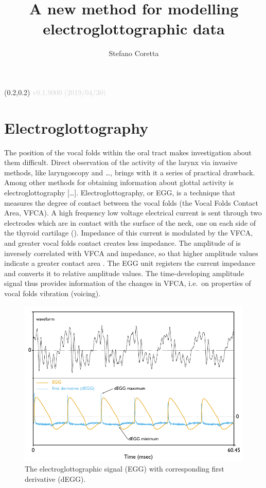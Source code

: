\documentclass[
  12pt,
  a4paper,
]{article}
\title{A new method for modelling electroglottographic data}
\author{Stefano Coretta}
\date{}
\begin{document}
\begin{textblock}{3}(0.2,0.2)
  \textcolor{lightgray}{v0.1.9000 (2019/04/30)}
\end{textblock}
\maketitle

\hypertarget{electroglottography}{%
\section{Electroglottography}\label{electroglottography}}

The position of the vocal folds within the oral tract makes
investigation about them difficult. Direct observation of the activity
of the larynx via invasive methods, like laryngoscopy and \ldots{},
brings with it a series of practical drawback. Among other methods for
obtaining information about glottal activity is electroglottography
{[}\ldots{}{]}. Electroglottography, or EGG, \citep{fabre1957} is a
technique that measures the degree of contact between the vocal folds
(the Vocal Folds Contact Area, VFCA). A high frequency low voltage
electrical current is sent through two electrodes which are in contact
with the surface of the neck, one on each side of the thyroid cartilage
(). Impedance of this current is modulated by the
VFCA, and greater vocal folds contact creates less impedance. The
amplitude of is inversely correlated with VFCA and impedance, so that
higher amplitude values indicate a greater contact area
\citep{titze1990}. The EGG unit registers the current impedance and
converts it to relative amplitude values. The time-developing amplitude
signal thus provides information of the changes in VFCA, i.e.~on
properties of vocal folds vibration (voicing).

\begin{figure}
  \includegraphics{./img/degg-signal.pdf}
  \caption{The electroglottographic signal (EGG) with corresponding first derivative (dEGG).}
  \label{f:egg}
\end{figure}
\end{document}
